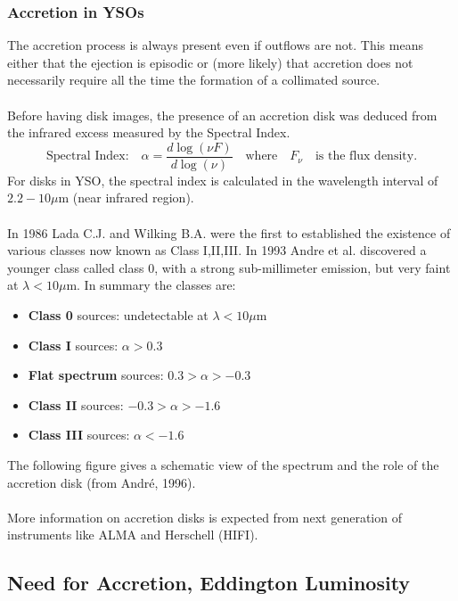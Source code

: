 \documentclass[10pt,a4paper]{article}
\begin{document}
\subsubsection{Accretion in YSOs}
The accretion process is always present even if outflows are not. This means either that the ejection is episodic or (more likely) that accretion does not necessarily require all the time the formation of a collimated source.\\
\\
Before having disk images, the presence of an accretion disk was deduced from the infrared excess measured by the Spectral Index.
\[\text{Spectral Index:}\quad \alpha=\frac{d\log(\nu F)}{d \log(\nu)}\quad\text{where}\quad F_{\nu}\quad\text{is the flux density.}\]
For disks in YSO, the spectral index is calculated in the wavelength interval of $2.2-10 \mu$m (near infrared region).\\
\\
In 1986 Lada C.J. and Wilking B.A. were the first to established the existence of various classes now known as Class I,II,III. In 1993 Andre et al. discovered a younger class called class 0, with a strong sub-millimeter emission, but very faint at $\lambda<10\mu$m. In summary the classes are:
\begin{itemize}
\item \textbf{Class 0} sources: undetectable at $\lambda<10\mu$m
\item \textbf{Class I} sources: $\alpha>0.3$
\item \textbf{Flat spectrum} sources: $0.3>\alpha>-0.3$
\item \textbf{Class II} sources: $-0.3>\alpha>-1.6$
\item \textbf{Class III} sources: $\alpha<-1.6$
\end{itemize}
The following figure gives a schematic view of the spectrum and the role of the accretion disk (from André, 1996).\\
\\
More information on accretion disks is expected from next generation of instruments like ALMA and Herschell (HIFI).
\subsection{Need for Accretion, Eddington Luminosity}
\end{document}
